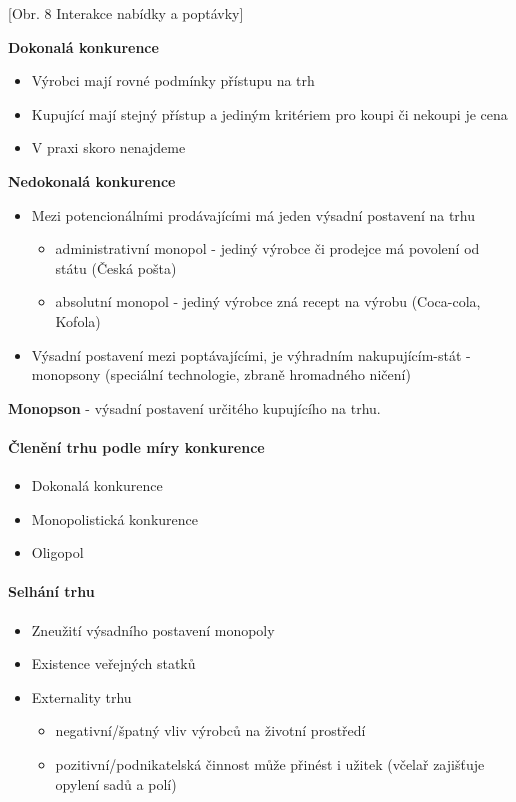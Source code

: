 \documentclass[11pt,a4paper,twoside]{book}
\begin{document}
	[Obr. 8 Interakce nabídky a poptávky]
	
	\textbf{Dokonalá konkurence}
	\begin{itemize}
		\item Výrobci mají rovné podmínky přístupu na trh
		\item Kupující mají stejný přístup a jediným kritériem pro koupi či nekoupi je cena
		\item V praxi skoro nenajdeme
	\end{itemize}
	
	\textbf{Nedokonalá konkurence}
	\begin{itemize}
		\item Mezi potencionálními prodávajícími má jeden výsadní postavení na trhu
		\begin{itemize}
			\item administrativní monopol - jediný výrobce či prodejce má povolení od státu (Česká pošta)
			\item absolutní monopol - jediný výrobce zná recept na výrobu (Coca-cola, Kofola)
		\end{itemize}
		\item Výsadní postavení mezi poptávajícími, je výhradním nakupujícím-stát - monopsony (speciální technologie, zbraně hromadného ničení)
	\end{itemize}
	
	\textbf{Monopson} - výsadní postavení určitého kupujícího na trhu.
	
	\paragraph*{Členění trhu podle míry konkurence}
	\begin{itemize}
		\item Dokonalá konkurence
		\item Monopolistická konkurence
		\item Oligopol
	\end{itemize}
	
	\paragraph*{Selhání trhu}
	\begin{itemize}
		\item Zneužití výsadního postavení monopoly
		\item Existence veřejných statků
		\item Externality trhu
		\begin{itemize}
			\item negativní/špatný vliv výrobců na životní prostředí
			\item pozitivní/podnikatelská činnost může přinést i užitek (včelař zajišťuje opylení sadů a polí)
		\end{itemize}
	\end{itemize}
	
\end{document}
